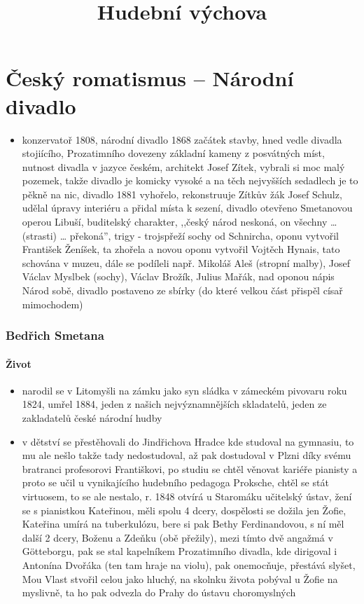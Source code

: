 \documentclass{article}
\title{\vspace{-2cm}\textbf{Hudební výchova}\vspace{-1.7cm}}
\date{}
\author{}
\begin{document}
\maketitle

\part{Český romatismus -- Národní divadlo}
\begin{itemize}
  \item konzervatoř 1808, národní divadlo 1868 začátek stavby, hned vedle divadla stojiícího, Prozatimního dovezeny základní kameny z posvátných míst, nutnost divadla v jazyce českém, architekt Josef Zítek, vybrali si moc malý pozemek, takže divadlo je komicky vysoké a na těch nejvyšších sedadlech je to pěkně na nic, divadlo 1881 vyhořelo, rekonstruuje Zítkův žák Josef Schulz, udělal úpravy interiéru a přidal místa k sezení, divadlo otevřeno Smetanovou operou Libuší, buditelský charakter, ,,český národ neskoná, on všechny … (strasti) … překoná”, trigy - trojspřeží sochy od Schnircha, oponu vytvořil František Ženíšek, ta zhořela a novou oponu vytvořil Vojtěch Hynais, tato schována v muzeu, dále se podíleli např. Mikoláš Aleš (stropní malby), Josef Václav Myslbek (sochy), Václav Brožík, Julius Mařák, nad oponou nápis Národ sobě, divadlo postaveno ze sbírky (do které velkou část přispěl císař mimochodem)
\end{itemize}

\section{Bedřich Smetana}

\subsection{Život}
\begin{itemize}
  \item narodil se v Litomyšli na zámku jako syn sládka v zámeckém pivovaru roku 1824, umřel 1884, jeden z našich nejvýznamnějších skladatelů, jeden ze zakladatelů české národní hudby
  \item v dětství se přestěhovali do Jindřichova Hradce kde studoval na gymnasiu, to mu ale nešlo takže tady nedostudoval, až pak dostudoval v Plzni díky svému bratranci profesorovi Františkovi, po studiu se chtěl věnovat kariéře pianisty a proto se učil u vynikajícího hudebního pedagoga Proksche, chtěl se stát virtuosem, to se ale nestalo, r. 1848 otvírá u Staromáku učitelský ústav, žení se s pianistkou Kateřinou, měli spolu 4 dcery, dospělosti se dožila jen Žofie, Kateřina umírá na tuberkulózu, bere si pak Bethy Ferdinandovou, s ní měl další 2 dcery, Boženu a Zdeňku (obě přežily), mezi tímto dvě angažmá v Götteborgu, pak se stal kapelníkem Prozatimního divadla, kde dirigoval i Antonína Dvořáka (ten tam hraje na violu), pak onemocňuje, přestává slyšet, Mou Vlast stvořil celou jako hluchý, na skolnku života pobýval u Žofie na myslivně, ta ho pak odvezla do Prahy do ústavu choromyslných
\end{itemize}
\end{document}
